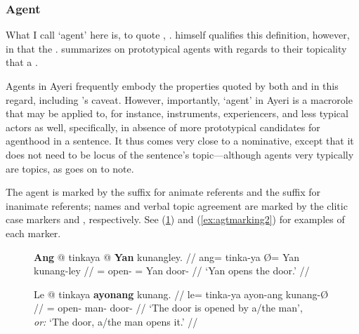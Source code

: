\subsubsection{Agent}
\label{subsubsec:agent}

What I call `agent' here is, to quote \citet{fillmore1968},
. \citet{fillmore1968}
himself qualifies this definition, however, in that the . \citet{payne1997} summarizes on prototypical agents with regards
to their topicality that a .

Agents in Ayeri frequently embody the properties quoted by both
\citet{fillmore1968} and \citet{payne1997} in this regard, including
\citet{fillmore1968}'s caveat. However, importantly, `agent' in Ayeri is a
macrorole that may be applied to, for instance, instruments, experiencers, and
less typical actors as well, specifically, in absence of more prototypical
candidates for agenthood in a sentence. It thus comes very close to a
nominative, except that it does not need to be locus of the sentence's
topic---although agents very typically are
topics, as \citet[151]{payne1997} goes on to note.

The agent is marked by the suffix  for animate referents and
the suffix  for inanimate referents; names and verbal topic
agreement are marked by the clitic case markers  and
, respectively. See (\ref{ex:agtmarking1}) and
(\ref{ex:agtmarking2}) for examples of each marker.

\begin{figure}
\pex\label{ex:agtmarking1}
\a\begingl
	\gla \textbf{Ang} @ tinkaya {} @ \textbf{Yan} kunangley. //
	\glb ang= tinka-ya Ø= Yan kunang-ley //
	\glc \AgtT{}= open-\TsgM{} \Top{}= Yan door-\PargI{} //
	\glft `Yan opens the door.' //
\endgl

\a\begingl
	\gla Le @ tinkaya \textbf{ayonang} kunang. //
	\glb le= tinka-ya ayon-ang kunang-Ø //
	\glc \PatT{}= open-\TsgM{} man-\Aarg{} door-\Top{} //
	\glft `The door is opened by a/the man',\\
		\textit{or:} `The door, a/the man opens it.' //
\endgl
\xe
\end{figure}

